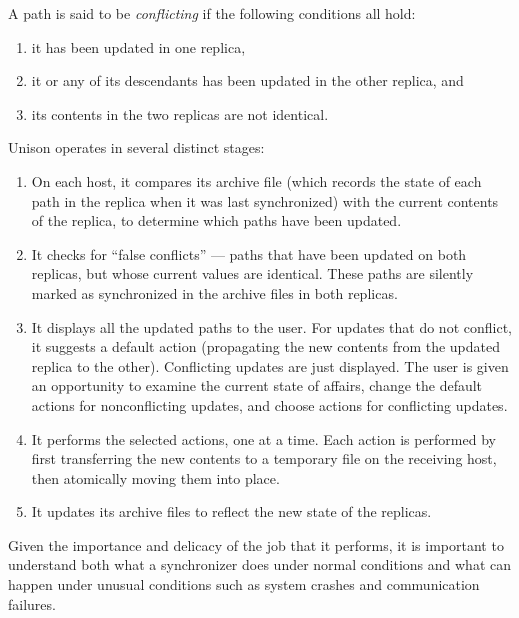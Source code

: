 \documentclass{article}
\begin{document}
A path is said to be {\em conflicting} if the following conditions all hold:
\begin{enumerate}
\item it has been updated in one replica,
\item it or any of its descendants has been updated in the other
  replica,
and
\item its contents in the two replicas are not identical.
\end{enumerate}




Unison operates in several distinct stages:
\begin{enumerate}
\item On each host, it compares its archive file (which records
the state of each path in the replica when it was last synchronized)
with the current contents of the replica, to determine which paths
have been updated.
\item It checks for ``false conflicts'' --- paths that have been
updated on both replicas, but whose current values are identical.
These paths are silently marked as synchronized in the archive files
in both replicas.
\item It displays all the updated paths to the user.  For updates that
do not conflict, it suggests a default action (propagating the new
contents from the updated replica to the other).  Conflicting updates
are just displayed.  The user is given an opportunity to examine the
current state of affairs, change the default actions for
nonconflicting updates, and choose actions for conflicting updates.
\item It performs the selected actions, one at a time.  Each action is
performed by first transferring the new contents to a temporary file
on the receiving host, then atomically moving them into place.
\item It updates its archive files to reflect the new state of the
replicas.
\end{enumerate}


Given the importance and delicacy of the job that it performs, it is
important to understand both what a synchronizer does under normal
conditions and what can happen under unusual conditions such as system
crashes and communication failures.
\end{document}
